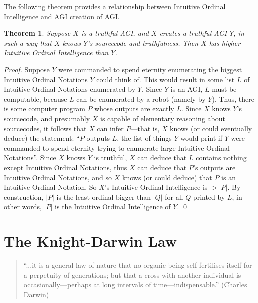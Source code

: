 \documentclass[runningheads]{llncs}
\newtheorem{mytheorem}{Theorem}
\begin{document}
The following theorem provides a relationship between Intuitive Ordinal Intelligence
and AGI creation of AGI.

\begin{mytheorem}
\label{maintheorem}
    Suppose $X$ is a truthful AGI, and $X$ creates a truthful AGI $Y$,
    in such a way that $X$ knows $Y$'s sourcecode and truthfulness. Then
    $X$ has higher Intuitive Ordinal Intelligence than $Y$.
\end{mytheorem}

\begin{proof}
    Suppose $Y$ were commanded to
    spend eternity enumerating the biggest Intuitive Ordinal Notations $Y$ could
    think of. This would result in some list $L$ of Intuitive Ordinal Notations
    enumerated by $Y$. Since $Y$ is an AGI, $L$ must be computable, because $L$ can
    be enumerated by a robot (namely by $Y$). Thus, there is some computer program
    $P$ whose outputs are exactly $L$. Since $X$ knows $Y$'s sourcecode,
    and presumably $X$ is capable of elementary reasoning about sourcecodes,
    it follows that $X$ can infer $P$---that is,
    $X$ knows (or could eventually deduce) the statement: ``$P$ outputs
    $L$, the list of things $Y$ would print if $Y$ were commanded to spend eternity
    trying to enumerate large Intuitive Ordinal Notations''.
    Since $X$ knows $Y$ is truthful,
    $X$ can deduce that $L$ contains nothing except Intuitive Ordinal Notations,
    thus $X$ can deduce that $P$'s outputs are Intuitive Ordinal Notations,
    and so $X$ knows (or could deduce) that $P$ is an Intuitive Ordinal Notation.
    So $X$'s Intuitive Ordinal Intelligence is $>|P|$. By construction, $|P|$ is
    the least ordinal bigger than $|Q|$ for all $Q$ printed by $L$, in other words,
    $|P|$ is the Intuitive Ordinal Intelligence of $Y$.
    \qed
\end{proof}

\section{The Knight-Darwin Law}
\label{knightdarwinagisection}

\begin{quote}
``...it is a general law of nature that no organic being self-fertilises itself
for a perpetuity of generations; but that a cross with another individual
is occasionally---perhaps at long intervals of time---indispensable.''
(Charles Darwin)
\end{quote}
\end{document}
